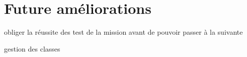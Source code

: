 \chapter{Future améliorations}
obliger la réussite des test de la mission avant de pouvoir passer à la suivante

gestion des classes
